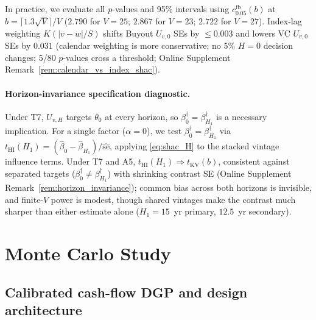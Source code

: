 \documentclass[12pt]{article}
\begin{document}
In practice, we evaluate all $p$-values and 95\% intervals using $c_{0.05}^{\mathrm{fb}}(b)$ at $b = \lceil 1.3\sqrt{V}\rceil / V$ ($2.790$ for $V=25$; $2.867$ for $V=23$; $2.722$ for $V=27$).
Index-lag weighting $K(|v - w|/S)$ shifts Buyout $U_{v,0}$ SEs by $\le 0.003$ and lowers VC $U_{v,0}$ SEs by $0.031$ (calendar weighting is more conservative; no 5\% $H=0$ decision changes; 5/80 $p$-values cross a threshold; Online Supplement Remark~\ref{rem:calendar_vs_index_shac}).

\paragraph{Horizon-invariance specification diagnostic.}
Under T7, $U_{v,H}$ targets $\theta_0$ at every horizon, so $\beta_0^\dagger = \beta_{H_1}^\dagger$ is a necessary implication. For a single factor ($\alpha = 0$), we test $\beta_0^\dagger = \beta_{H_1}^\dagger$ via $t_{\mathrm{HI}}(H_1) = (\hat\beta_0 - \hat\beta_{H_1})/\widehat{\mathrm{se}}$, applying \eqref{eq:shac_H} to the stacked vintage influence terms. Under T7 and A5, $t_{\mathrm{HI}}(H_1) \Rightarrow t_{\mathrm{KV}}(b)$, consistent against separated targets ($\beta_0^\dagger \neq \beta_{H_1}^\dagger$) with shrinking contrast SE (Online Supplement Remark~\ref{rem:horizon_invariance}); common bias across both horizons is invisible, and finite-$V$ power is modest, though shared vintages make the contrast much sharper than either estimate alone ($H_1 = 15$~yr primary, $12.5$~yr secondary).

\section{Monte Carlo Study}
\label{sec:simulation_study}

\subsection{Calibrated cash-flow DGP and design architecture}
\label{sec:mc_design}
\end{document}
